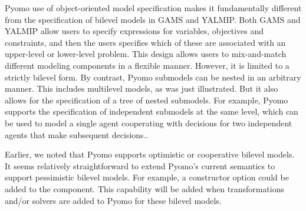 Pyomo use of object-oriented model specification makes it fundamentally
different from the specification of bilevel models in GAMS and
YALMIP.  Both GAMS and YALMIP allow users to specify expressions
for variables, objectives and constraints, and then the users
specifies which of these are associated with an upper-level or
lower-level problem.  This design allows users to mix-and-match
different modeling components in a flexible manner.  However, it
is limited to a strictly bilevel form.  By contrast, Pyomo submodels
can be nested in an arbitrary manner.  This includes multilevel
models, as was just illustrated.  But it also allows for the
specification of a tree of nested submodels.  For example, Pyomo
supports the specification of independent submodels at the same
level, which can be used to model a single agent cooperating with
decisions for two independent agents that make subsequent decisions..

Earlier, we noted that Pyomo supports optimistic or cooperative
bilevel models.  It seems relatively straightforward to extend
Pyomo's current semantics to support pessimistic bilevel models.
For example, a  constructor option could be added
to the  component.  This capability will be added
when transformations and/or solvers are added to Pyomo for these
bilevel models.
